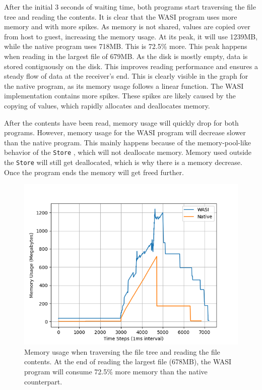 After the initial 3 seconds of waiting time, both programs start traversing the file tree and reading the contents. It is clear that the \acrshort{WASI} program uses more memory and with more spikes. As memory is not shared, values are copied over from host to guest, increasing the memory usage. At its peak, it will use 1239MB, while the native program uses 718MB. This is 72.5\% more. This peak happens when reading in the largest file of 679MB. As the disk is mostly empty, data is stored contiguously on the disk. This improves reading performance and ensures a steady flow of data at the receiver's end. This is clearly visible in the graph for the native program, as its memory usage follows a linear function. The \acrshort{WASI} implementation contains more spikes. These spikes are likely caused by the copying of values, which rapidly allocates and deallocates memory.

After the contents have been read, memory usage will quickly drop for both programs. However, memory usage for the \acrshort{WASI} program will decrease slower than the native program. This mainly happens because of the memory-pool-like behavior of the \texttt{Store} \cite{wasmtime_store}, which will not deallocate memory. Memory used outside the \texttt{Store} will still get deallocated, which is why there is a memory decrease. Once the program ends the memory will get freed further.

\begin{figure}[H]
  \centering
  \includegraphics[width=1\textwidth]{images/mass_storage_comparison.png}
  \caption{Memory usage when traversing the file tree and reading the file contents. At the end of reading the largest file (678MB), the \acrshort{WASI} program will consume 72.5\% more memory than the native counterpart.}
  \label{fig:mass_storage_memory_comparison}
\end{figure}



